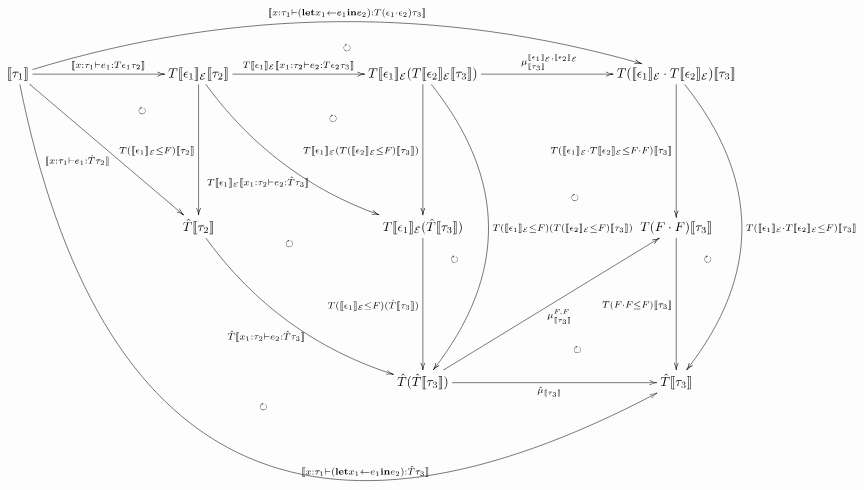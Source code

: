 \documentclass[12pt]{article}
\newcommand{\semanticf}[1]{\llbracket #1\rrbracket}
\begin{document}
\pagestyle{empty}

\begin{align*}
  \vcenter{
    \xymatrix@=100pt{
      \semanticf{\tau_1}
      \ar@/^40pt/@{->}[rrr]^{\semanticf{x: \tau_1 \vdash (\mathrel{\mathbf{let}} x_1 \gets e_1 \mathrel{\mathbf{in}} e_2): T (\epsilon_1 \cdot \epsilon_2) \tau_3}}
      \ar@/^20pt/@{{}{ }{}}[rrr]|{\circlearrowright}
      \ar@{->}[r]^{\semanticf{x: \tau_1 \vdash e_1: T \epsilon_1 \tau_2}}
      \ar@{->}[rd]_{\semanticf{x: \tau_1 \vdash e_1: \hat{T} \tau_2}}
      \ar@/^40pt/@{{}{ }{}}[rd]|{\circlearrowright}
      \ar@/_190pt/@{->}[rrrdd]^(0.67){\semanticf{x: \tau_1 \vdash (\mathrel{\mathbf{let}} x_1 \gets e_1 \mathrel{\mathbf{in}} e_2): \hat{T} \tau_3}}
      \ar@/_150pt/@{{}{ }{}}[rrrdd]|{\circlearrowright}
      &
      T \semanticf{\epsilon_1}_{\mathcal{E}} \semanticf{\tau_2}
      \ar@{->}[r]^-{T \semanticf{\epsilon_1}_{\mathcal{E}} \semanticf{x_1: \tau_2 \vdash e_2: T \epsilon_2 \tau_3}}
      \ar@/_20pt/@{->}[rd]_{T \semanticf{\epsilon_1}_{\mathcal{E}} \semanticf{x_1: \tau_2 \vdash e_2: \hat{T} \tau_3}}
      \ar@/^30pt/@{{}{ }{}}[rd]|{\circlearrowright}
      \ar@{->}[d]_{T (\semanticf{\epsilon_1}_{\mathcal{E}} \leq F) \semanticf{\tau_2}}
      \ar@/_20pt/@{{}{ }{}}[rdd]|{\circlearrowright}
      &
      T \semanticf{\epsilon_1}_{\mathcal{E}} (T \semanticf{\epsilon_2}_{\mathcal{E}} \semanticf{\tau_3})
      \ar@{->}[r]^{\mu^{\semanticf{\epsilon_1}_{\mathcal{E}},\semanticf{\epsilon_2}_{\mathcal{E}}}_{\semanticf{\tau_3}}}
      \ar@{->}[d]_{T \semanticf{\epsilon_1}_{\mathcal{E}} (T (\semanticf{\epsilon_2}_{\mathcal{E}} \leq F) \semanticf{\tau_3})}
      \ar@/^50pt/@{->}[dd]^{T (\semanticf{\epsilon_1}_{\mathcal{E}} \leq F) (T (\semanticf{\epsilon_2}_{\mathcal{E}} \leq F) \semanticf{\tau_3})}
      \ar@/^25pt/@{{}{ }{}}[dd]|(0.6){\circlearrowright}
      &
      T (\semanticf{\epsilon_1}_{\mathcal{E}} \cdot T \semanticf{\epsilon_2}_{\mathcal{E}}) \semanticf{\tau_3}
      \ar@/^50pt/@{->}[dd]^{T (\semanticf{\epsilon_1}_{\mathcal{E}} \cdot T \semanticf{\epsilon_2}_{\mathcal{E}} \leq F) \semanticf{\tau_3}}
      \ar@/^25pt/@{{}{ }{}}[dd]|(0.6){\circlearrowright}
      \ar@{->}[d]_{T (\semanticf{\epsilon_1}_{\mathcal{E}} \cdot T \semanticf{\epsilon_2}_{\mathcal{E}} \leq F \cdot F) \semanticf{\tau_3}}
      \\
      &
      \hat{T} \semanticf{\tau_2}
      \ar@/_20pt/@{->}[rd]_{\hat{T} \semanticf{x_1: \tau_2 \vdash e_2: \hat{T} \tau_3}}
      &
      T \semanticf{\epsilon_1}_{\mathcal{E}} (\hat{T} \semanticf{\tau_3})
      \ar@{->}[d]_{T (\semanticf{\epsilon_1}_{\mathcal{E}} \leq F) (\hat{T} \semanticf{\tau_3})}
      &
      T (F \cdot F) \semanticf{\tau_3}
      \ar@{->}[d]_{T (F \cdot F \leq F) \semanticf{\tau_3}}
      \\
      &
      &
      \hat{T} (\hat{T} \semanticf{\tau_3})
      \ar@{->}[ru]_{\mu^{F,F}_{\semanticf{\tau_3}}}
      \ar@/_40pt/@{{}{ }{}}[ru]|{\circlearrowright}
      \ar@{->}[r]_{\hat{\mu}_{\semanticf{\tau_3}}}
      \ar@{{}{ }{}}[ruu]|(0.6){\circlearrowright}
      &
      \hat{T} \semanticf{\tau_3}
    }
  }
\end{align*}
\end{document}
